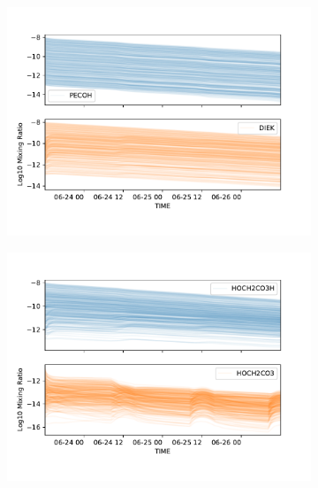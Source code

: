 \begin{figure}[H]
\begin{subfigure}[t]{.5\textwidth}
  \centering
  \includegraphics[width=\textwidth]{ensemble/PECOH-DIEK.pdf}
  \caption{}
\end{subfigure}%
\begin{subfigure}[t]{.5\textwidth}
  \centering
  \includegraphics[width=\textwidth]{ensemble/HOCH2CO3H-HOCH2CO3.pdf}
  \caption{}
\end{subfigure}%


\end{figure}
